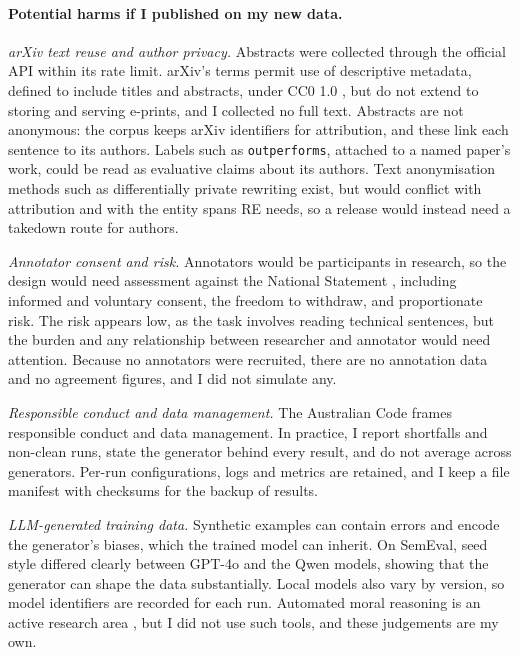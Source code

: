 \paragraph{Potential harms if I published on my new data.}
\emph{arXiv text reuse and author privacy.} Abstracts were collected through the official API within its rate limit. arXiv's terms permit use of descriptive metadata, defined to include titles and abstracts, under CC0 1.0 \citep{arxivtou}, but do not extend to storing and serving e-prints, and I collected no full text. Abstracts are not anonymous: the corpus keeps arXiv identifiers for attribution, and these link each sentence to its authors. Labels such as \texttt{outperforms}, attached to a named paper's work, could be read as evaluative claims about its authors. Text anonymisation methods such as differentially private rewriting \citep{meisenbacher-etal-2024-dp} exist, but would conflict with attribution and with the entity spans RE needs, so a release would instead need a takedown route for authors.

\emph{Annotator consent and risk.} Annotators would be participants in research, so the design would need assessment against the National Statement \citep{nhmrc-national-statement-2025}, including informed and voluntary consent, the freedom to withdraw, and proportionate risk. The risk appears low, as the task involves reading technical sentences, but the burden and any relationship between researcher and annotator would need attention. Because no annotators were recruited, there are no annotation data and no agreement figures, and I did not simulate any.

\emph{Responsible conduct and data management.} The Australian Code \citep{nhmrc-code-2018} frames responsible conduct and data management. In practice, I report shortfalls and non-clean runs, state the generator behind every result, and do not average across generators. Per-run configurations, logs and metrics are retained, and I keep a file manifest with checksums for the backup of results.

\emph{LLM-generated training data.} Synthetic examples can contain errors and encode the generator's biases, which the trained model can inherit. On SemEval, seed style differed clearly between GPT-4o and the Qwen models, showing that the generator can shape the data substantially. Local models also vary by version, so model identifiers are recorded for each run. Automated moral reasoning is an active research area \citep{pyatkin-etal-2023-clarifydelphi}, but I did not use such tools, and these judgements are my own.

